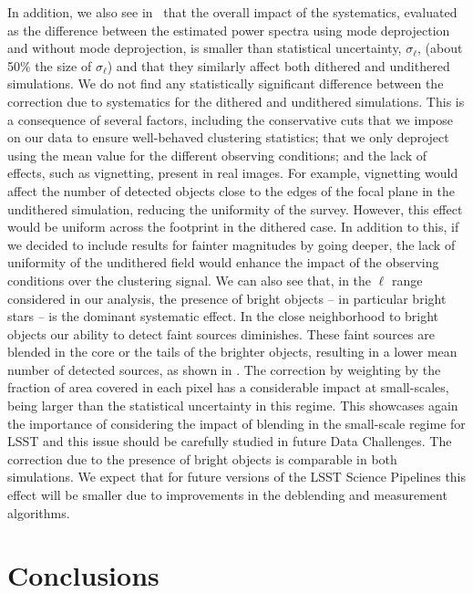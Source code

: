 \documentclass[\docopts]{\docclass}
\begin{document}
In addition, we also see in~ that the overall impact of the systematics, evaluated as the difference between the estimated power spectra using mode deprojection and without mode deprojection, is smaller than statistical uncertainty, $\sigma_{\ell}$, (about 50\% the size of $\sigma_{\ell}$) and that they similarly affect both dithered and undithered simulations. We do not find any statistically significant difference between the correction due to systematics for the dithered and undithered simulations. This is a consequence of several factors, including the conservative cuts that we impose on our data to ensure well-behaved clustering statistics; that we only deproject using the mean value for the different observing conditions; and the lack of effects, such as vignetting, present in real images. For example, vignetting would affect the number of detected objects close to the edges of the focal plane in the undithered simulation, reducing the uniformity of the survey. However, this effect would be uniform across the footprint in the dithered case. In addition to this, if we decided to include results for fainter magnitudes by going deeper, the lack of uniformity of the undithered field would enhance the impact of the observing conditions over the clustering signal. We can also see that, in the $\ell$ range considered in our analysis, the presence of bright objects -- in particular bright stars -- is the dominant systematic effect. In the close neighborhood to bright objects our ability to detect faint sources diminishes. These faint sources are blended in the core or the tails of the brighter objects, resulting in a lower mean number of detected sources, as shown in . The correction by weighting by the fraction of area covered in each pixel has a considerable impact at small-scales, being larger than the statistical uncertainty in this regime. This showcases again the importance of considering the impact of blending in the small-scale regime for LSST and this issue should be carefully studied in future Data Challenges. The correction due to the presence of bright objects is comparable in both simulations. We expect that for future versions of the LSST Science Pipelines this effect will be smaller due to improvements in the deblending and measurement algorithms.


\section{Conclusions}
\label{sec:conclusions}
\end{document}
